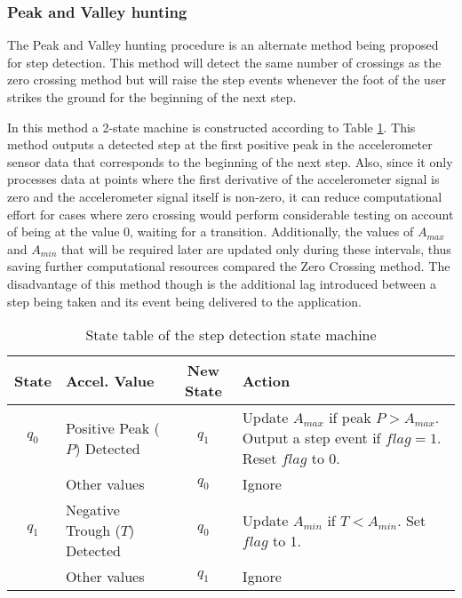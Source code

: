 \documentclass[10pt,journal,letterpaper,compsoc]{IEEEtran}
\begin{document}
\subsubsection{Peak and Valley hunting\label{sec:peak_and_valley}}

The Peak and Valley hunting procedure is an alternate method being
proposed for step detection.
This method will detect the same number of crossings as the zero crossing 
method but will raise the step events whenever the foot of the user 
strikes the ground for the beginning of the next step. 

In this method a 2-state machine is constructed according to Table
\ref{tbl:peak_valley_state_table}. This method outputs a detected step at 
the first positive peak in the accelerometer sensor data that corresponds to 
the beginning of the next step. Also, since it only processes data at 
points where the first derivative of the accelerometer signal is zero and 
the accelerometer signal itself is non-zero, it can reduce computational 
effort for cases where zero crossing would perform considerable testing
on account of being at the value 0, waiting for a transition. Additionally,
the values of $A_{max}$ and $A_{min}$ that will be required later are 
updated only during these intervals, thus saving further computational 
resources compared the Zero Crossing method. The disadvantage of this method
though is the additional lag introduced between a step being taken and its 
event being delivered to the application.

\begin{table}[h]\centering
    \begin{tabular}{c p{1in} c p{2.7in}} \hline
    State & Accel. Value     & New State &  Action\\     \hline
    $q_0$ & Positive Peak ($P$) Detected  & $q_1$     & Update $A_{max}$ if peak $P > A_{max}$. Output a step event if $flag = 1$. Reset $flag$ to 0.  \\ 
          & Other values            & $q_0$     & Ignore \\         \hline
    $q_1$ & Negative Trough ($T$) Detected & $q_0$    & Update $A_{min}$ if $T < A_{min}$. Set $flag$ to 1. \\
          & Other values            & $q_1$     & Ignore \\ \hline
    \end{tabular}
    \caption{State table of the step detection state machine\label{tbl:peak_valley_state_table}}
\end{table}
\end{document}
